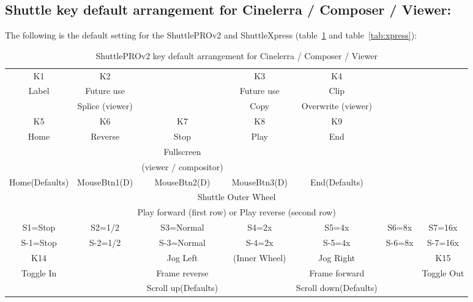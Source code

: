 \subsection{Shuttle key default arrangement for Cinelerra / Composer / Viewer:}%
\label{sub:shuttle_key_default_cinelerra}

The following is the default setting for the ShuttlePROv2 and ShuttleXpress (table~\ref{tab:shuttleprov2} and table~\ref{tab:xpress}):

\begin{landscape}   
    \begin{table}[htpb]
        \centering
        \caption{ShuttlePROv2 key default arrangement for Cinelerra / Composer / Viewer}
        \label{tab:shuttleprov2}
        \begin{tabular}{c c c c c c c}       
            \toprule
            K1 & K2 & & K3 & K4 & & \\
            Label & Future use & & Future use & Clip & & \\
                  & Splice (viewer) & & Copy  & Overwrite (viewer) & & \\
                  \midrule
            K5 & K6 & K7 & K8 & K9 & & \\
            Home & Reverse & Stop & Play & End & & \\
                 &         & Fullscreen & & & & \\
                 &         & (viewer / compositor) & & & & \\
                 \midrule
            Home(Defaults) & MouseBtn1(D) & MouseBtn2(D) & MouseBtn3(D) & End(Defaults) & & \\
            \midrule
            \multicolumn{7}{c}{Shuttle Outer Wheel} \\
            \multicolumn{7}{c}{Play forward (first row) or Play reverse (second row)} \\        
            S1=Stop &   S2=1/2 &   S3=Normal  &  S4=2x  &  S5=4x  &  S6=8x &   S7=16x \\
            S-1=Stop &  S-2=1/2 &  S-3=Normal &  S-4=2x &  S-5=4x &  S-6=8x  & S-7=16x \\
            \midrule
            K14	& & Jog Left & (Inner Wheel) & Jog Right & & K15 \\ 
            Toggle In & & Frame reverse & & Frame forward & & Toggle Out \\
                      & & Scroll up(Defaults) & & Scroll down(Defaults) & & \\

\end{tabular}
\end{table}
\end{landscape}
